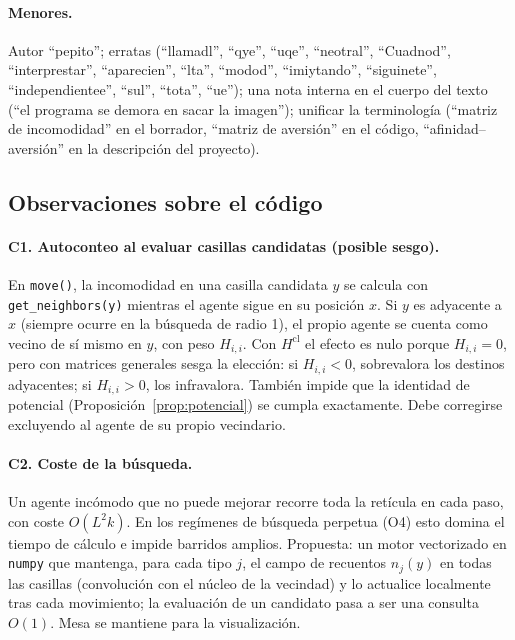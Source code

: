 \documentclass[11pt,a4paper]{article}
\theoremstyle{plain}
\theoremstyle{definition}
\theoremstyle{remark}
\begin{document}
\paragraph{Menores.}
Autor ``pepito''; erratas (``llamadl'', ``qye'', ``uqe'', ``neotral'',
``Cuadnod'', ``interprestar'', ``aparecien'', ``lta'', ``modod'',
``imiytando'', ``siguinete'', ``independientee'', ``sul'', ``tota'', ``ue'');
una nota interna en el cuerpo del texto (``el programa se demora en sacar la
imagen''); unificar la terminología (``matriz de incomodidad'' en el borrador,
``matriz de aversión'' en el código, ``afinidad--aversión'' en la descripción
del proyecto).

\subsection{Observaciones sobre el código}

\paragraph{C1. Autoconteo al evaluar casillas candidatas (posible sesgo).}
En \texttt{move()}, la incomodidad en una casilla candidata $y$ se calcula con
\texttt{get\_neighbors(y)} mientras el agente sigue en su posición $x$. Si $y$
es adyacente a $x$ (siempre ocurre en la búsqueda de radio 1), el propio agente
se cuenta como vecino de sí mismo en $y$, con peso $H_{i,i}$. Con
$H^{\mathrm{cl}}$ el efecto es nulo porque $H_{i,i}=0$, pero con matrices
generales sesga la elección: si $H_{i,i}<0$, sobrevalora los destinos
adyacentes; si $H_{i,i}>0$, los infravalora. También impide que la identidad de
potencial (Proposición~\ref{prop:potencial}) se cumpla exactamente. Debe
corregirse excluyendo al agente de su propio vecindario.

\paragraph{C2. Coste de la búsqueda.}
Un agente incómodo que no puede mejorar recorre toda la retícula en cada paso,
con coste $O(L^2k)$. En los regímenes de búsqueda perpetua (O4) esto domina el
tiempo de cálculo e impide barridos amplios. Propuesta: un motor vectorizado en
\texttt{numpy} que mantenga, para cada tipo $j$, el campo de recuentos
$n_j(y)$ en todas las casillas (convolución con el núcleo de la vecindad) y lo
actualice localmente tras cada movimiento; la evaluación de un candidato pasa a
ser una consulta $O(1)$. Mesa se mantiene para la visualización.
\end{document}
